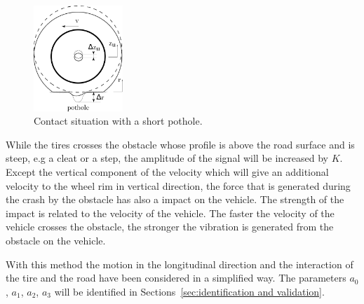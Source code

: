  \begin{figure}
 \centering
 \includegraphics[width=0.3\textwidth]{bilder/tire.png}
 \caption{Contact situation with a short pothole.}
 \label{fig:tire}
 \end{figure}

While the tires crosses the obstacle whose profile is above the road surface and is steep, e.g a cleat or a step, the amplitude of the signal will be increased by $K$.
%
Except the vertical component of the velocity which will give an additional velocity to the wheel rim in vertical direction, the force that is generated during the crash by the obstacle has also a impact on the vehicle. 
%
The strength of the impact is related to the velocity of the vehicle.
%
The faster the velocity of the vehicle crosses the obstacle, the stronger the vibration is generated from the obstacle on the vehicle.

With this method the motion in the longitudinal direction and the interaction of the tire and the road have been considered in a simplified way.
%
The parameters {$a_0$}, {$a_1$}, {$a_2$}, {$a_3$} will be identified in Sections~\ref{sec:identification and validation}.